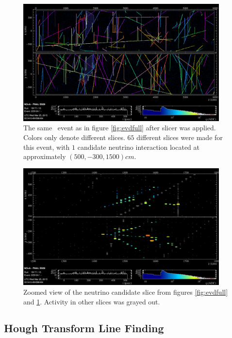 \begin{figure}[p]
  \centering
  \includegraphics[width=0.95\textwidth]{figures/evd/FullSlicer.png}
  \caption[An Example \nova~Event with Slicer Applied]{The same \nova~event as in figure \ref{fig:evdfull} after slicer was applied. Colors only denote different slices. $65$ different slices were made for this event, with $1$ candidate neutrino interaction located at approximately $(500, -300, 1500)\unit{cm}$.}
  \label{fig:evdfullslice}
\end{figure}

\begin{figure}[p]
  \centering
  \includegraphics[width=0.95\textwidth]{figures/evd/ZoomNone.png}
  \caption[An Example Neutrino Candidate Slice]{Zoomed view of the neutrino candidate slice from figures \ref{fig:evdfull} and \ref{fig:evdfullslice}. Activity in other slices was grayed out.}
  \label{fig:evdzoomslice}
\end{figure}

\subsection{Hough Transform Line Finding}
\label{sec:RecoHough}


